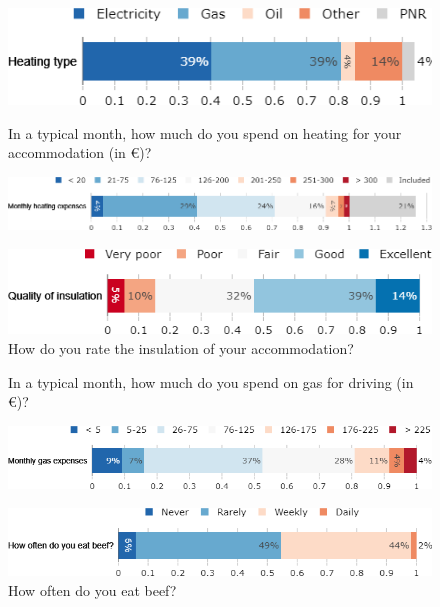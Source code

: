 \begin{framefont}{\small}
\begin{frame}{}
\begin{figure}[h!]
\centering
\includegraphics[width=.43\paperwidth]{../figures/FR/heating_FR.png} \\
\vspace{.5cm}
\caption{In a typical month, how much do you spend on heating for your accommodation (in \euro{})?}
\includegraphics[width=.61\paperwidth]{../figures/FR/heating_expenses_FR.png} \\
\vspace{.5cm}
\centering
\caption{How do you rate the insulation of your accommodation?}
\includegraphics[width=.52\paperwidth]{../figures/FR/insulation_FR.png}
\end{figure}
\end{frame}

\begin{frame}{}%
\begin{figure}[h!]
\centering
\caption{In a typical month, how much do you spend on gas for driving (in \euro{})?}
\includegraphics[width=.52\paperwidth]{../figures/FR/gas_expenses_FR.png} \\
\vspace{.5cm}
\vspace{.5cm}
\caption{How often do you eat beef?}
\includegraphics[width=.61\paperwidth]{../figures/FR/frequency_beef_FR.png}
\end{figure}
\end{frame}



\end{framefont}
